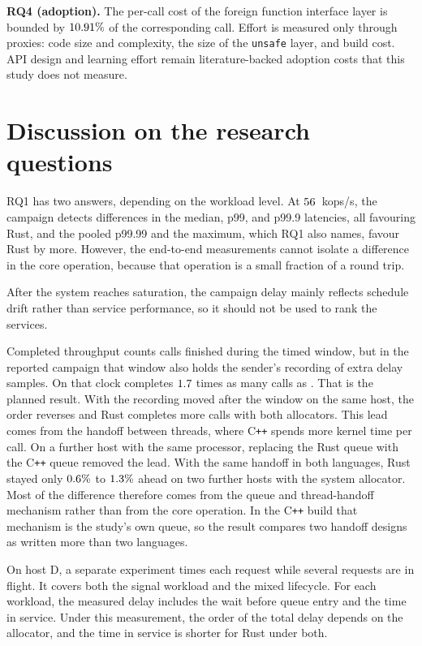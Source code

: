 \documentclass[english,oneside,a4paper,censored,csm,software-track-2020]{HYthesisML}
\begin{document}
\begin{compactitem}
\item \textbf{RQ4 (adoption).} The per-call cost of the foreign function interface layer is
bounded by $10.91\%$ of the corresponding call. Effort is measured only through
proxies: code size and complexity, the size of the \texttt{unsafe} layer, and build cost. API
design and learning effort remain literature-backed adoption costs that this study does not
measure.
\end{compactitem}

\section{Discussion on the research questions}\label{sec:rqdiscussion}
RQ1 has two answers, depending on the workload level. At $56$~kops/s,
the campaign detects differences in the median, p99, and p99.9 latencies, all
favouring Rust, and the pooled p99.99 and the maximum, which RQ1 also names,
favour Rust by more. However, the end-to-end measurements cannot isolate a
difference in the core operation, because that operation is a small fraction of
a round trip.

After the system reaches saturation, the campaign delay mainly reflects
schedule drift rather than service performance, so it should not be used to
rank the services.

Completed throughput counts calls finished during the timed window, but in the
reported campaign that window also holds the sender's recording of extra delay
samples. On that clock \OverloadSustainedFaster{} completes $1.7$
times as many calls as \OverloadSustainedSlower{}. That is the planned result.
With the recording moved after the window on the same host, the order reverses
and Rust completes more calls with both allocators. This lead comes from the
handoff between threads, where C\texttt{++} spends more kernel time per call. On
a further host with the same processor, replacing the Rust queue with the
C\texttt{++} queue removed the lead. With the same handoff in both languages,
Rust stayed only $0.6\%$ to $1.3\%$ ahead on two
further hosts with the system allocator. Most of the difference therefore comes from the queue and
thread-handoff mechanism rather than from the core operation. In the
C\texttt{++} build that mechanism is the study's own queue, so the result
compares two handoff designs as written more than two languages.

On host D, a separate experiment times each request while several requests
are in flight. It covers both the signal workload and the mixed lifecycle. For
each workload, the measured delay includes the wait before queue entry and the
time in service. Under this measurement, the order of the total delay depends on the
allocator, and the time in service is shorter for Rust under both.
\end{document}
